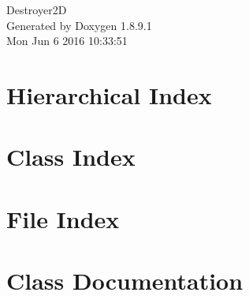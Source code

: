 \documentclass[twoside]{book}
\newcommand{\+}{\discretionary{\mbox{\scriptsize$\hookleftarrow$}}{}{}}
\newcommand{\clearemptydoublepage}{%
  \newpage{\pagestyle{empty}\cleardoublepage}%
}
\begin{document}
\hypersetup{pageanchor=false,
             bookmarks=true,
             bookmarksnumbered=true,
             pdfencoding=unicode
            }
\begin{titlepage}
\vspace*{7cm}
\begin{center}%
{\Large Destroyer2\+D }\\
\vspace*{1cm}
{\large Generated by Doxygen 1.8.9.1}\\
\vspace*{0.5cm}
{\small Mon Jun 6 2016 10:33:51}\\
\end{center}
\end{titlepage}
\clearemptydoublepage
\tableofcontents
\clearemptydoublepage
{}
\hypersetup{pageanchor=true}

\chapter{Hierarchical Index}

\chapter{Class Index}

\chapter{File Index}

\chapter{Class Documentation}










































\end{document}
